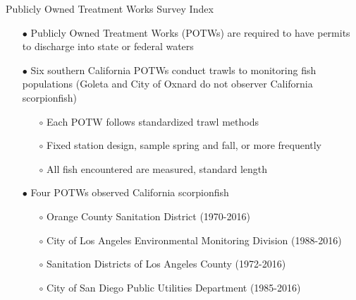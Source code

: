 \documentclass[ignorenonframetext,]{beamer}
\begin{document}
\begin{frame}{Publicly Owned Treatment Works Survey Index}

\begin{itemize}
\item[$\bullet$] Publicly Owned Treatment Works (POTWs) are required to have permits to discharge into state or federal waters
\item[$\bullet$] Six southern California POTWs conduct trawls to monitoring fish populations (Goleta and City of Oxnard do not observer California scorpionfish)
\begin{itemize}
\item[$\circ$] Each POTW follows standardized trawl methods
\item[$\circ$] Fixed station design, sample spring and fall, or more frequently
\item[$\circ$] All fish encountered are measured, standard length
\end{itemize}
\item[$\bullet$]  Four POTWs observed California scorpionfish
\begin{itemize}
\item[$\circ$] Orange County Sanitation District (1970-2016)
\item[$\circ$] City of Los Angeles Environmental Monitoring Division (1988-2016)
\item[$\circ$] Sanitation Districts of Los Angeles County (1972-2016)
\item[$\circ$] City of San Diego Public Utilities Department (1985-2016)
\end{itemize}
\end{itemize}

\end{frame}
\end{document}
